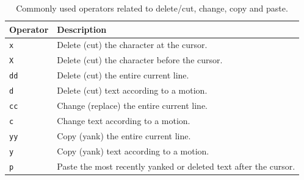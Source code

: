 \begin{table}[!htb]
  \centering \caption{Commonly used operators related to delete/cut, change, copy and paste.}\label{ch:tfe:tab:deletecut}
  \begin{tabularx}{\textwidth}{lX}
    \hline
    Operator & Description \\ \hline
    \verb|x| & Delete (cut) the character at the cursor. \\ 
    \verb|X| & Delete (cut) the character before the cursor. \\ 
    \verb|dd| & Delete (cut) the entire current line. \\ 
    \verb|d| & Delete (cut) text according to a motion. \\ 
    \verb|cc| & Change (replace) the entire current line. \\ 
    \verb|c| & Change text according to a motion. \\ 
    \verb|yy| & Copy (yank) the entire current line. \\ 
    \verb|y| & Copy (yank) text according to a motion. \\ 
    \verb|p| & Paste the most recently yanked or deleted text after the cursor. \\ 
    \hline
  \end{tabularx}
\end{table}

